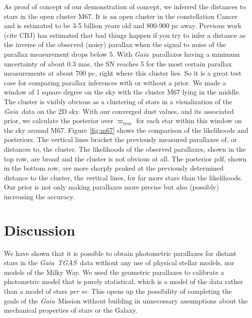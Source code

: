 \documentclass[modern]{aastex61}
\newcommand{\foreign}[1]{\textsl{#1}}
\newcommand{\acronym}[1]{{\small{#1}}}
\newcommand{\project}[1]{\textsl{#1}}
\newcommand{\tgas}{\project{\acronym{TGAS}}}
\newcommand{\gaia}{\project{Gaia}}
\newcommand{\true}{\mathrm{true}}
\begin{document}
As proof of concept of our demonstration of concept, we inferred the distances to stars in the open cluster M67. It is an open cluster in the constellation Cancer and is estimated to be 3-5 billion years old and 800-900 pc away. Previous work (cite CBJ) has estimated that bad things happen if you try to infer a distance as the inverse of the observed (noisy) parallax when the signal to noise of the parallax measurement drops below 5. With \gaia\ parallaxes having a minimum uncertainty of about 0.3 mas, the SN reaches 5 for the most certain parallax measurements at about 700 pc, right where this cluster lies. So it is a great test case for comparing parallax inferences with or without a prior. We made a window of 1 square degree on the sky with the cluster M67 lying in the middle. The cluster is visibly obvious as a clustering of stars in a visualization of the \gaia\ data on the 2D sky. With our converged dust values, and its associated prior, we calculate the posterior over $\varpi_{\true}$ for each star within this window on the sky around M67. Figure \ref{fig:m67} shows the comparison of the likelihoods and posteriors. The vertical lines bracket the previously measured parallaxes of, or distances to, the cluster. The likelihoods of the observed parallaxes, shown in the top row, are broad and the cluster is not obvious at all. The posterior pdf, shown in the bottom row, are more sharply peaked at the previously determined distance to the cluster, the vertical lines, for far more stars than the likelihoods. Our prior is not only making parallaxes more precise but also (possibly) increasing the accuracy.


\section{Discussion}

We have shown that it is possible to obtain photometric parallaxes for
distant stars in the \gaia\ \tgas\ data without any use of physical stellar
models, nor models of the Milky Way.
We used the geometric parallaxes to calibrate a photometric
model that is purely statistical, which is a model of the data rather than
a model of stars \foreign{per se}.
This opens up the possibility of completing the goals of the \gaia\ Mission
without building in unnecessary assumptions about the mechanical properties
of stars or the Galaxy.
\end{document}
